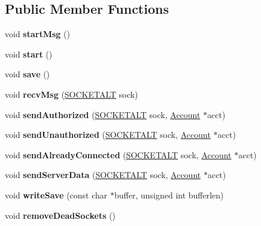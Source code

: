 \subsection*{Public Member Functions}
\begin{DoxyCompactItemize}
\item 
void {\bfseries start\+Msg} ()\hypertarget{classAccountServer_aa35e263aacb22a4e2620f70d8329ac9a}{}\label{classAccountServer_aa35e263aacb22a4e2620f70d8329ac9a}

\item 
void {\bfseries start} ()\hypertarget{classAccountServer_a7628cfd55af988183b9d1f29360f419a}{}\label{classAccountServer_a7628cfd55af988183b9d1f29360f419a}

\item 
void {\bfseries save} ()\hypertarget{classAccountServer_a277cf839fc049f8dad8af203b461d11e}{}\label{classAccountServer_a277cf839fc049f8dad8af203b461d11e}

\item 
void {\bfseries recv\+Msg} (\hyperlink{classSOCKETALT}{S\+O\+C\+K\+E\+T\+A\+LT} sock)\hypertarget{classAccountServer_ae2011d8f1febf26f6a43edf4e05ddcb7}{}\label{classAccountServer_ae2011d8f1febf26f6a43edf4e05ddcb7}

\item 
void {\bfseries send\+Authorized} (\hyperlink{classSOCKETALT}{S\+O\+C\+K\+E\+T\+A\+LT} sock, \hyperlink{classAccount}{Account} $\ast$acct)\hypertarget{classAccountServer_a72c7d2f749dff93bb737b2830b918937}{}\label{classAccountServer_a72c7d2f749dff93bb737b2830b918937}

\item 
void {\bfseries send\+Unauthorized} (\hyperlink{classSOCKETALT}{S\+O\+C\+K\+E\+T\+A\+LT} sock, \hyperlink{classAccount}{Account} $\ast$acct)\hypertarget{classAccountServer_aead7aed91e964baf95c4ce1889f49170}{}\label{classAccountServer_aead7aed91e964baf95c4ce1889f49170}

\item 
void {\bfseries send\+Already\+Connected} (\hyperlink{classSOCKETALT}{S\+O\+C\+K\+E\+T\+A\+LT} sock, \hyperlink{classAccount}{Account} $\ast$acct)\hypertarget{classAccountServer_ad0c6211a987a80b2b458e4201df69872}{}\label{classAccountServer_ad0c6211a987a80b2b458e4201df69872}

\item 
void {\bfseries send\+Server\+Data} (\hyperlink{classSOCKETALT}{S\+O\+C\+K\+E\+T\+A\+LT} sock, \hyperlink{classAccount}{Account} $\ast$acct)\hypertarget{classAccountServer_a29fe0df9be18acd85603263b9e6575c4}{}\label{classAccountServer_a29fe0df9be18acd85603263b9e6575c4}

\item 
void {\bfseries write\+Save} (const char $\ast$buffer, unsigned int bufferlen)\hypertarget{classAccountServer_a0dc28c294cf6c00b2e3ed65142b4be6d}{}\label{classAccountServer_a0dc28c294cf6c00b2e3ed65142b4be6d}

\item 
void {\bfseries remove\+Dead\+Sockets} ()\hypertarget{classAccountServer_afc183267a620e94f2f8cf1ace47512b2}{}\label{classAccountServer_afc183267a620e94f2f8cf1ace47512b2}

\end{DoxyCompactItemize}


